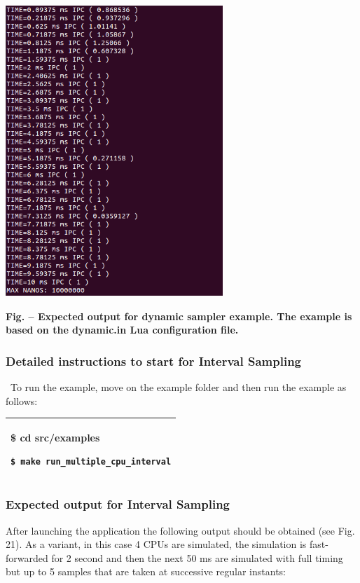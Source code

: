 \documentclass[a4paper]{article}
\newcounter{Figure}
\renewcommand\theFigure{\arabic{Figure}}
\begin{document}
{\centering 
\includegraphics[width=3.2319in,height=4.3335in]{img36.png}
\par}

{\centering{}\sffamily\bfseries
\label{bkm:Ref388170618}Fig.
\stepcounter{Figure}{\theFigure} -- Expected output for dynamic sampler
example. The example is based on the dynamic.in Lua configuration file.
\par}

\subsubsection[Detailed instructions to start for Interval
Sampling]{\textrm{Detailed instructions to
start}\foreignlanguage{english}{\textrm{ for Interval Sampling}}}
{
\ To run the example, move on the example folder and then run the
example as follows:}

\begin{flushleft}
\tablehead{}
\begin{supertabular}{|m{6.21846in}|}
\hline
{\ttfamily \$ cd src/examples}

 \texttt{\$ make
run\_multiple\_cpu\_interval}\\\hline
\end{supertabular}
\end{flushleft}
\subsubsection[Expected output for Interval Sampling]{\textrm{Expected
output}\foreignlanguage{english}{\textrm{ for Interval Sampling}}}
{
After launching the application the following output should be obtained
(see Fig. 21). As a variant, in this case 4 CPUs are simulated, the
simulation is fast-forwarded for 2 second and then the next 50 ms are
simulated with full timing but up to 5 samples that are taken at
successive regular instants:}
\end{document}
